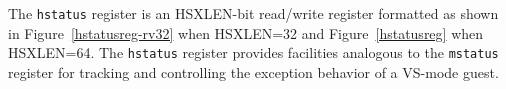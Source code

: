 The {\tt hstatus} register is an HSXLEN-bit read/write register
formatted as shown in Figure~\ref{hstatusreg-rv32} when HSXLEN=32 and
Figure~\ref{hstatusreg} when HSXLEN=64.
The {\tt hstatus}
register provides facilities analogous to the {\tt mstatus} register
for tracking and controlling the exception behavior of a VS-mode guest.

\begin{figure*}[h!]
{\footnotesize
\begin{center}
\setlength{\tabcolsep}{4pt}
\end{center}
}
\vspace{-0.1in}
\caption{Hypervisor status register ({\tt hstatus}) for RV32.}
\label{hstatusreg-rv32}
\end{figure*}

